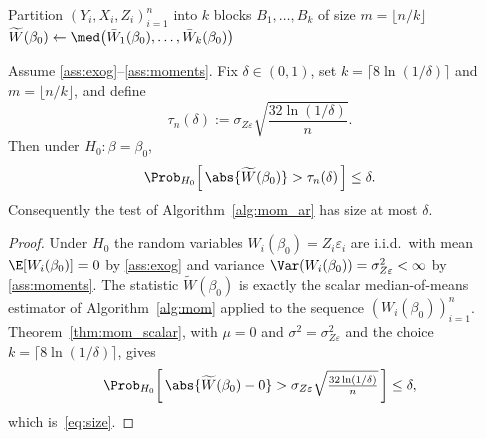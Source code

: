\begin{algorithm}[H]
\label{alg:mom_ar}
\caption{Median-of-Means Anderson--Rubin Test}
Partition $(Y_i,X_i,Z_i)_{i=1}^{n}$ into $k$ blocks $B_1,\dots,B_k$ of size
$m=\lfloor n/k\rfloor$\;
$\widetilde{W}(\beta_0) \leftarrow
  \med\bigl(\bar{W}_1(\beta_0),\dots,\bar{W}_k(\beta_0)\bigr)$\;
\;
\end{algorithm}


\begin{theorem}
\label{thm:mom_ar_size}
Assume \ref{ass:exog}--\ref{ass:moments}. Fix $\delta\in(0,1)$, set
$k=\lceil 8\ln(1/\delta)\rceil$ and $m=\lfloor n/k\rfloor$, and define
\begin{equation}
  \tau_n(\delta) := \sigma_{Z\varepsilon}\sqrt{\frac{32\ln(1/\delta)}{n}}.
  \label{eq:tau}
\end{equation}
Then under $H_0\colon\beta=\beta_0$,
\begin{equation}
  \Prob_{H_0}\!\left[\,\abs{\widetilde{W}(\beta_0)} > \tau_n(\delta)\,\right]
    \le \delta.
  \label{eq:size}
\end{equation}
Consequently the test of Algorithm~\ref{alg:mom_ar} has size at most $\delta$.
\end{theorem}
 
\begin{proof}
Under $H_0$ the random variables $W_i(\beta_0)=Z_i\varepsilon_i$ are i.i.d.\ with mean $\E[W_i(\beta_0)] = 0$ by \ref{ass:exog} and variance $\Var(W_i(\beta_0)) = \sigma_{Z\varepsilon}^2 < \infty$ by \ref{ass:moments}. The statistic $\widetilde{W}(\beta_0)$ is exactly the scalar median-of-means estimator of Algorithm~\ref{alg:mom} applied to the sequence
$(W_i(\beta_0))_{i=1}^{n}$. Theorem~\ref{thm:mom_scalar}, with $\mu=0$ and
$\sigma^2=\sigma_{Z\varepsilon}^2$ and the choice
$k=\lceil 8\ln(1/\delta)\rceil$, gives
\[
  \Prob_{H_0}\!\left[\,\abs{\widetilde{W}(\beta_0) - 0}
       > \sigma_{Z\varepsilon}\sqrt{\tfrac{32\ln(1/\delta)}{n}}\,\right]
       \le \delta,
\]
which is~\eqref{eq:size}.
\end{proof}


